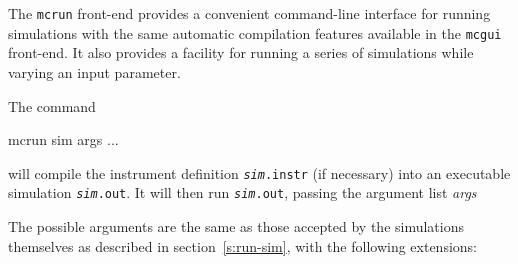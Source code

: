 The \verb+mcrun+ front-end provides a convenient
command-line interface for running simulations with the same automatic
compilation features available in the \verb+mcgui+ front-end. It also provides a
facility for running a series of simulations while varying an input parameter.

The command

\begin{bash}
mcrun sim args ...
\end{bash}

will compile the instrument definition \texttt{\textit{sim}.instr} (if
necessary) into an executable simulation \texttt{\textit{sim}.out}. It
will then run \texttt{\textit{sim}.out}, passing the argument list \textit{
  args}

The possible arguments are the same as those accepted by the simulations
themselves as described in section~\ref{s:run-sim}, with the following
extensions:
